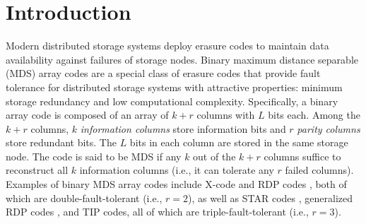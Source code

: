 \documentclass[conference]{IEEEtran}
\begin{document}
\section{Introduction}

Modern distributed storage systems deploy erasure codes to maintain data
availability against failures of storage nodes.  Binary maximum distance
separable (MDS) array codes are a special class of erasure codes that provide
fault tolerance for distributed storage systems with attractive properties:
minimum storage redundancy and low computational complexity.  Specifically, a
binary array code is composed of an array of $k+r$ columns with $L$ bits each.
Among the $k+r$ columns, $k$ \emph{information columns} store information bits
and $r$ \emph{parity columns} store redundant bits. The $L$ bits in each
column are stored in the same storage node.
The code is said to be MDS if any $k$ out of the $k+r$ columns suffice to
reconstruct all $k$ information columns (i.e., it can tolerate any $r$ failed
columns).  Examples of binary MDS array codes include X-code \cite{xu1999x}
and RDP codes \cite{corbett2004row}, both of which are double-fault-tolerant
(i.e., $r=2$), as well as STAR codes \cite{huang2008star}, generalized RDP
codes \cite{blaum2006family}, and TIP codes, all of which are
triple-fault-tolerant (i.e., $r=3$).
\end{document}
